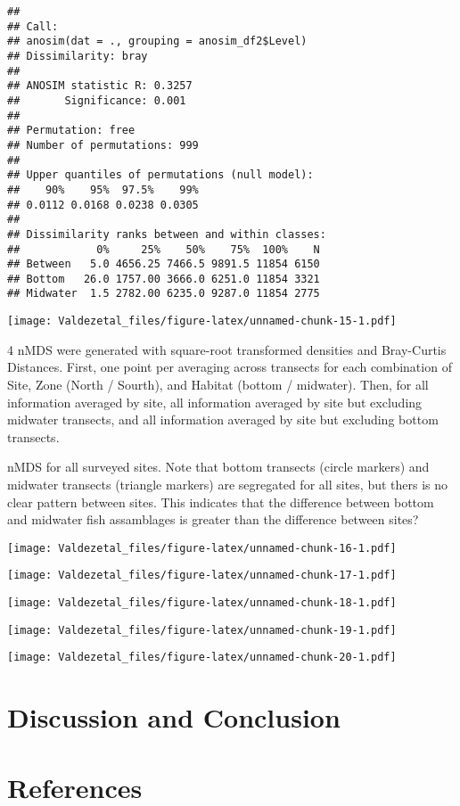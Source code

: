 \documentclass[12pt,]{article}
\begin{document}
\begin{verbatim}
## 
## Call:
## anosim(dat = ., grouping = anosim_df2$Level) 
## Dissimilarity: bray 
## 
## ANOSIM statistic R: 0.3257 
##       Significance: 0.001 
## 
## Permutation: free
## Number of permutations: 999
## 
## Upper quantiles of permutations (null model):
##    90%    95%  97.5%    99% 
## 0.0112 0.0168 0.0238 0.0305 
## 
## Dissimilarity ranks between and within classes:
##            0%     25%    50%    75%  100%    N
## Between   5.0 4656.25 7466.5 9891.5 11854 6150
## Bottom   26.0 1757.00 3666.0 6251.0 11854 3321
## Midwater  1.5 2782.00 6235.0 9287.0 11854 2775
\end{verbatim}

\texttt{[image: Valdezetal\_files/figure-latex/unnamed-chunk-15-1.pdf]}

4 nMDS were generated with square-root transformed densities and
Bray-Curtis Distances. First, one point per averaging across transects
for each combination of Site, Zone (North / Sourth), and Habitat (bottom
/ midwater). Then, for all information averaged by site, all information
averaged by site but excluding midwater transects, and all information
averaged by site but excluding bottom transects.

nMDS for all surveyed sites. Note that bottom transects (circle markers)
and midwater transects (triangle markers) are segregated for all sites,
but thers is no clear pattern between sites. This indicates that the
difference between bottom and midwater fish assamblages is greater than
the difference between sites?

\texttt{[image: Valdezetal\_files/figure-latex/unnamed-chunk-16-1.pdf]}

\texttt{[image: Valdezetal\_files/figure-latex/unnamed-chunk-17-1.pdf]}

\texttt{[image: Valdezetal\_files/figure-latex/unnamed-chunk-18-1.pdf]}

\texttt{[image: Valdezetal\_files/figure-latex/unnamed-chunk-19-1.pdf]}

\texttt{[image: Valdezetal\_files/figure-latex/unnamed-chunk-20-1.pdf]}

\section{Discussion and Conclusion}\label{discussion-and-conclusion}

\section{References}\label{references}
\end{document}
